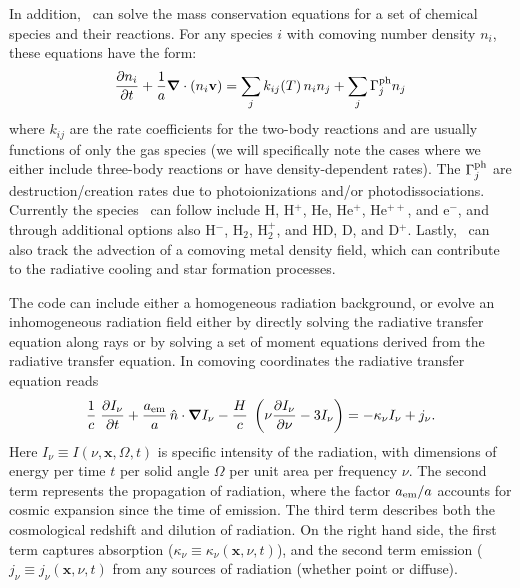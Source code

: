 
In addition, \enzo\ can solve the mass conservation equations for a set of
chemical species and their reactions.  For any species $i$ with comoving
number density $n_i$, these equations have the form:
\begin{equation}
  \frac{\partial n_i}{\partial t} 
  + \frac{1}{a} \div (n_i \vecv) = 
  \sum_j k_{ij}(T) \, n_i n_j + \sum_j \Gamma^{\rm ph}_j n_j 
  \label{eq:species_evolution}
\end{equation}
where $k_{ij}$ are the rate coefficients for the two-body reactions
and are usually functions of only the gas species (we will
specifically note the cases where we either include three-body
reactions or have density-dependent rates).  The $\Gamma^{\rm ph}_j$
are destruction/creation rates due to photoionizations and/or
photodissociations.  Currently the species \enzo\ can follow include
H, H$^+$, He, He$^+$, He$^{++}$, and e$^-$, and through additional
options also H$^-$, H$_2$, H$_2^+$, and HD, D, and D$^+$. Lastly,
\enzo\ can also track the advection of a comoving metal density field,
which can contribute to the radiative cooling and star formation
processes.

The code can include either a homogeneous radiation background, 
or evolve an inhomogeneous
radiation field either by directly solving the radiative transfer
equation along rays or by solving a set of moment equations derived
from the radiative transfer equation. In comoving coordinates
\citep[e.g.,][]{Gnedin97} the radiative transfer equation reads
%
\begin{equation}
  \label{eq:rteqn}
  \frac{1}{c} \; \frac{\partial I_\nu}{\partial t} + 
  \frac{a_{\rm em}}{a} \, \hat{n} \cdot \grad I_\nu -
  \frac{H}{c} \; \left( \nu \frac{\partial I_\nu}{\partial \nu} -
  3 I_\nu \right) = -\kappa_\nu I_\nu + j_\nu .
\end{equation}
%
Here $I_\nu \equiv I(\nu, \mathbf{x}, \Omega, t)$ is specific
intensity of the radiation, with dimensions of energy per time $t$ per
solid angle $\Omega$ per unit area per frequency $\nu$.  The second
term represents the propagation of radiation, where the factor $a_{\rm
  em}/a$ accounts for cosmic expansion since the time of emission.
The third term describes both the cosmological redshift and dilution
of radiation.  On the right hand side, the first term captures
absorption ($\kappa_\nu \equiv \kappa_\nu(\mathbf{x},\nu,t)$), and the
second term emission ($j_\nu \equiv j_\nu(\mathbf{x},\nu,t)$ from any
sources of radiation (whether point or diffuse).

